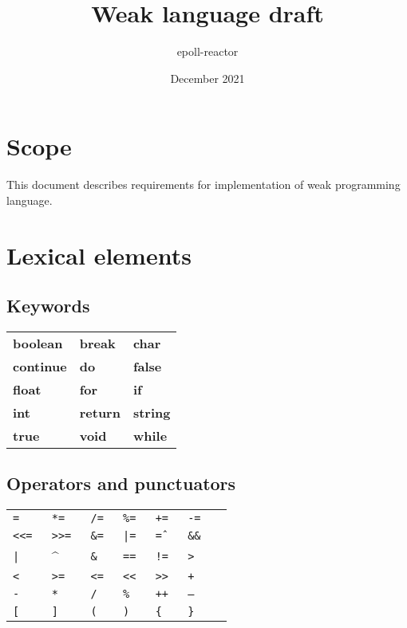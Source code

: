 \documentclass{article}
\title{Weak language draft}
\author{epoll-reactor}
\date{December 2021}
\begin{document}
	\pagestyle{fancy}
	\rhead{\leftmark}
	
	\maketitle
	\tableofcontents
	
	\newpage
	
	\section{Scope}
		This document describes requirements for implementation of weak
		programming language.
		
	\section{Lexical elements}
		\upshape
		
		\subsection{Keywords}
			\begin{tabular}{ R{3cm} R{3cm} R{3cm} }
				\textbf{boolean}  & \textbf{break}  & \textbf{char}   \\
				\textbf{continue} & \textbf{do }    & \textbf{false}  \\
				\textbf{float}    & \textbf{for}    & \textbf{if}     \\
				\textbf{int}      & \textbf{return} & \textbf{string} \\
				\textbf{true}     & \textbf{void}   & \textbf{while}  \\
			\end{tabular}
		
		\subsection{Operators and punctuators}
			\begin{tabular}{ R{1.5cm} R{1.5cm} R{1.5cm} R{1.5cm} R{1.5cm} R{1.5cm} R{1.5cm} }
				\tt{=}   & \tt{*=}     & \tt{/=}  & \tt{\%=} & \tt{+=}  & \tt{-=}   \\
				\tt{<<=} & \tt{>>=}    & \tt{\&=} & \tt{|=}  & \tt{\^=} & \tt{\&\&} \\
				\tt{|}   & \textbf{\^} & \tt{\&}  & \tt{==}  & \tt{!=}  & \tt{>}    \\
				\tt{<}   & \tt{>=}     & \tt{<=}  & \tt{<<}  & \tt{>>}  & \tt{+}    \\
				\tt{-}   & \tt{*}      & \tt{/}   & \tt{\%}  & \tt{++}  & \tt{--}   \\
				\tt{[}   & \tt{]}      & \tt{(}   & \tt{)}   & \tt{\{}  & \tt{\}}   \\
			\end{tabular}
		
\end{document}
